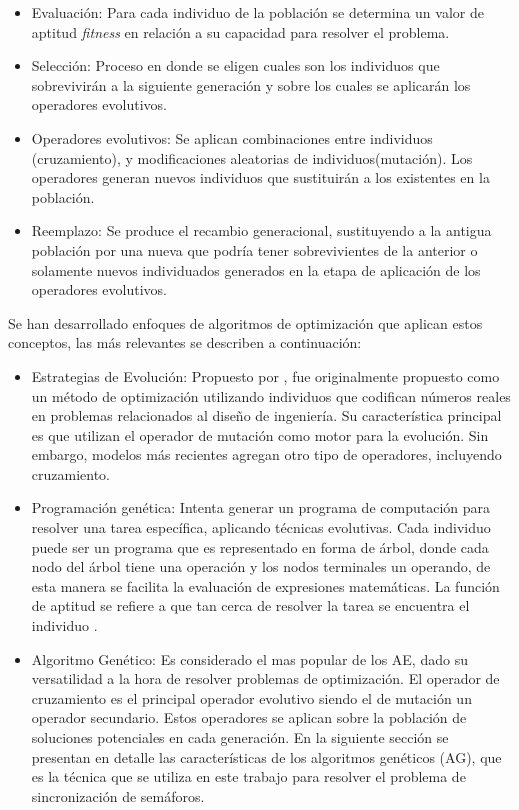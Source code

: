 \begin{itemize}
	\item Evaluación: Para cada individuo de la población se determina un valor de aptitud \emph{fitness} en relación a su capacidad para resolver el problema. 
	\item Selección: Proceso en donde se eligen cuales son los individuos que sobrevivirán a la siguiente generación y sobre los cuales se aplicarán los operadores evolutivos.
	\item Operadores evolutivos: Se aplican combinaciones entre individuos (cruzamiento), y modificaciones aleatorias de individuos(mutación). Los operadores generan nuevos individuos que sustituirán a los existentes en la población.
	\item Reemplazo: Se produce el recambio generacional, sustituyendo a la antigua población por una nueva que podría tener sobrevivientes de la anterior o solamente nuevos individuados generados en la etapa de aplicación de los operadores evolutivos.
\end{itemize}

Se han desarrollado enfoques de algoritmos de optimización que aplican estos conceptos, las más relevantes se describen a continuación:

\begin{itemize}

	\item Estrategias de Evolución: Propuesto por \citet{Ingo1971}, fue originalmente propuesto como un método de optimización utilizando individuos que codifican números reales en problemas relacionados al diseño de ingeniería. Su característica principal es que utilizan el operador de mutación como motor para la evolución. Sin embargo, modelos más recientes agregan otro tipo de operadores, incluyendo cruzamiento.
	\item Programación genética: Intenta generar un programa de computación para resolver una tarea específica, aplicando técnicas evolutivas. Cada individuo puede ser un programa que es representado en forma de árbol, donde cada nodo del árbol tiene una operación y los nodos terminales un operando, de esta manera se facilita la evaluación de expresiones matemáticas. La función de aptitud se refiere a que tan cerca de resolver la tarea se encuentra el individuo \citep{Koza1992}.
	\item Algoritmo Genético: Es considerado el mas popular de los AE, dado su versatilidad a la hora de resolver problemas de optimización. El operador de cruzamiento es el principal operador evolutivo siendo el de mutación un operador secundario. Estos operadores se aplican sobre la población de soluciones potenciales en cada generación. En la siguiente sección se presentan en detalle las características de los algoritmos genéticos (AG), que es la técnica que se utiliza en este trabajo para resolver el problema de sincronización de semáforos.
	
\end{itemize}

